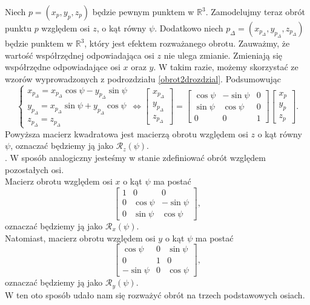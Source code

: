 \documentclass[a4paper,twoside,11pt,reqno]{mwrep}
\theoremstyle{plain} \newtheorem{twr}{Twierdzenie}
\theoremstyle{plain} \newtheorem{lem}{Lemat}
\theoremstyle{definition} \newtheorem{defi}{Definicja}
\theoremstyle{remark} \newtheorem*{wni}{Wniosek}
\theoremstyle{definition} \newtheorem{uwaga}{Uwaga}
\theoremstyle{definition}\newtheorem{prz}{Przykład}
\begin{document}
Niech $p=(x_p,y_p,z_p)$ będzie pewnym punktem w $\mathbb{R}^3$. Zamodelujmy teraz
obrót punktu $p$ względem osi $z$, o kąt równy $\psi$. 
Dodatkowo niech $p_\Delta=(x_{p_\Delta},y_{p_\Delta},z_{p_\Delta})$ będzie punktem w $\mathbb{R}^3$, 
który jest efektem rozważanego obrotu. 
Zauważmy, że wartość współrzędnej
odpowiadająca osi $z$ nie ulega zmianie. Zmieniają się współrzędne odpowiadające osi $x$ oraz $y$.
W takim razie, możemy skorzystać ze wzorów wyprowadzonych z podrozdziału \ref{obrot2drozdzial}.
Podsumowując
$$\left\{\begin{array}{l}
x_{p_\Delta} = x_{p_\Delta} \cos\psi - y_{p_\Delta}\sin\psi \\
y_{p_\Delta}=x_{p_\Delta}\sin\psi + y_{p_\Delta}\cos\psi\\
z_{p_\Delta} = z_{p_\Delta}
\end{array}\right. \Longleftrightarrow \begin{bmatrix}
x_{p_\Delta}\\
y_{p_\Delta}\\
z_{p_\Delta}
\end{bmatrix} =
\begin{bmatrix}
\cos\psi   & -\sin\psi&0 \\
\sin\psi & \cos\psi & 0\\
0&0&1
\end{bmatrix}
\begin{bmatrix}
x_{p} \\
y_{p} \\
z_{p}
\end{bmatrix}.$$
Powyższa macierz kwadratowa jest macierzą obrotu względem osi $z$ o kąt równy $\psi$, oznaczać będziemy ją jako $\mathcal{R}_z(\psi)$.\\. 
W sposób analogiczny jesteśmy w stanie zdefiniować obrót względem pozostałych osi.\\
Macierz obrotu względem osi $x$ o kąt $\psi$ ma postać
 $$\begin{bmatrix}
 1&0&0\\
0&\cos\psi   & -\sin\psi\\
0&\sin\psi & \cos\psi
\end{bmatrix},$$
oznaczać będziemy ją jako $\mathcal{R}_x(\psi)$.\\
Natomiast, macierz obrotu względem osi $y$ o kąt $\psi$ ma postać
$$\begin{bmatrix}
\cos\psi&0&\sin\psi\\
0&1   & 0\\
-\sin\psi &0 & \cos\psi
\end{bmatrix},$$
oznaczać będziemy ją jako $\mathcal{R}_y(\psi)$.\\
W ten oto sposób udało nam się rozważyć obrót na trzech podstawowych osiach.
\end{document}
